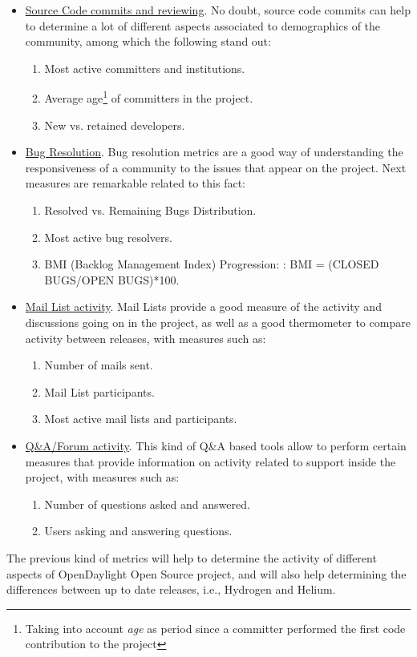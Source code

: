\documentclass[a4paper, 12pt]{book}
\begin{document}
\begin{itemize}\itemsep0pt
\item{\underline{Source Code commits and reviewing}}. No doubt, source code commits can help to determine a lot of different aspects associated to demographics of the community, among which the following stand out:
\begin{enumerate}\itemsep0pt
\item{Most active committers and institutions}.
\item{Average age\footnote{Taking into account \emph{age} as period since a committer performed the first code contribution to the project} of committers in the project}.
\item{New vs. retained developers}.
\end{enumerate}
\item{\underline{Bug Resolution}}. Bug resolution metrics are a good way of understanding the responsiveness of a community to the issues that appear on the project. Next measures are remarkable related to this fact:
\begin{enumerate}\itemsep0pt
\item{Resolved vs. Remaining Bugs Distribution}.
\item{Most active bug resolvers}.
\item{BMI (Backlog Management Index) Progression: : BMI = (CLOSED BUGS/OPEN BUGS)*100}.
\end{enumerate}
\item{\underline{Mail List activity}}. Mail Lists provide a good measure of the activity and discussions going on in the project, as well as a good thermometer to compare activity between releases, with measures such as:
\begin{enumerate}\itemsep0pt
\item{Number of mails sent}.
\item{Mail List participants}.
\item{Most active mail lists and participants}.
\end{enumerate}
\item{\underline{Q\&A/Forum activity}}. This kind of Q\&A based tools allow to perform certain measures that provide information on activity related to support inside the project, with measures such as:
\begin{enumerate}\itemsep0pt
\item{Number of questions asked and answered}.
\item{Users asking and answering questions}.
\end{enumerate}
\end{itemize}
The previous kind of metrics will help to determine the activity of different aspects of OpenDaylight Open Source project, and will also help determining the differences between up to date releases, i.e., Hydrogen and Helium.
\end{document}
